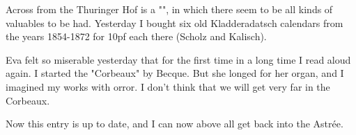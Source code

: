 Across from the Thuringer Hof is a "", in which there seem to be all kinds of valuables to be had. Yesterday I bought six old Kladderadatsch calendars from the years 1854-1872 for 10pf each there (Scholz and Kalisch).

Eva felt so miserable yesterday that for the first time in a long time I read aloud again. I started the "Corbeaux" by Becque. But she longed for her organ, and I imagined my works with orror. I don't think that we will get very far in the Corbeaux.

Now this entry is up to date, and I can now above all get back into the Astrée.

